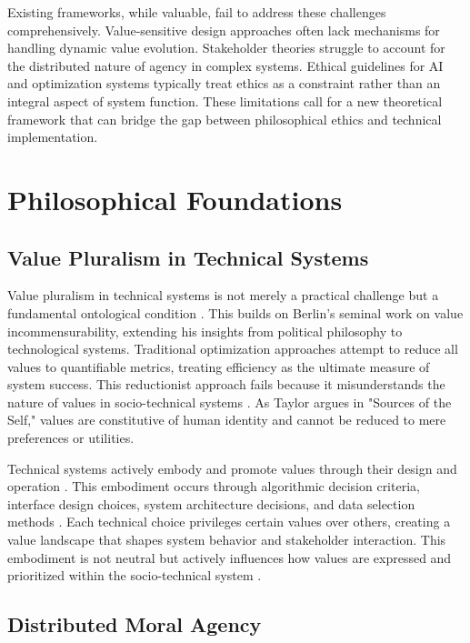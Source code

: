 \documentclass[12pt]{article}
\begin{document}
Existing frameworks, while valuable, fail to address these challenges comprehensively. Value-sensitive design approaches \parencite{friedman2019} often lack mechanisms for handling dynamic value evolution. Stakeholder theories \parencite{freeman2010} struggle to account for the distributed nature of agency in complex systems. Ethical guidelines for AI and optimization systems \parencite{ieee2019,floridi2018} typically treat ethics as a constraint rather than an integral aspect of system function. These limitations call for a new theoretical framework that can bridge the gap between philosophical ethics and technical implementation.

\section{Philosophical Foundations}

\subsection{Value Pluralism in Technical Systems}

Value pluralism in technical systems is not merely a practical challenge but a fundamental ontological condition \parencite{berlin1969}. This builds on Berlin's seminal work on value incommensurability, extending his insights from political philosophy to technological systems. Traditional optimization approaches attempt to reduce all values to quantifiable metrics, treating efficiency as the ultimate measure of system success. This reductionist approach fails because it misunderstands the nature of values in socio-technical systems \parencite{taylor1989,macintyre1981}. As Taylor argues in "Sources of the Self," values are constitutive of human identity and cannot be reduced to mere preferences or utilities.

Technical systems actively embody and promote values through their design and operation \parencite{winner1980}. This embodiment occurs through algorithmic decision criteria, interface design choices, system architecture decisions, and data selection methods \parencite{selbst2019}. Each technical choice privileges certain values over others, creating a value landscape that shapes system behavior and stakeholder interaction. This embodiment is not neutral but actively influences how values are expressed and prioritized within the socio-technical system \parencite{latour2005}.

\subsection{Distributed Moral Agency}
\end{document}
